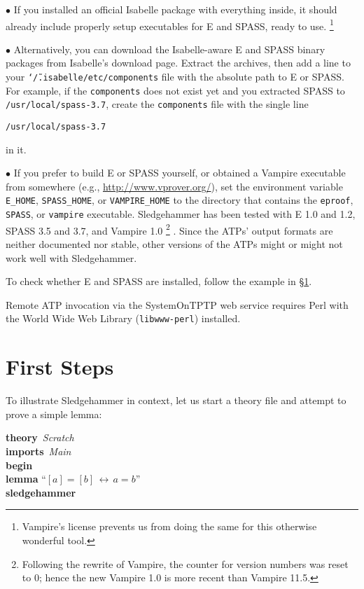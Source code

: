 \documentclass[a4paper,12pt]{article}
\begin{document}
\begin{enum}
\item[$\bullet$] If you installed an official Isabelle package with everything
inside, it should already include properly setup executables for E and SPASS,
ready to use.%
\footnote{Vampire's license prevents us from doing the same for this otherwise
wonderful tool.}

\item[$\bullet$] Alternatively, you can download the Isabelle-aware E and SPASS
binary packages from Isabelle's download page. Extract the archives, then add a
line to your \texttt{\char`\~/.isabelle/etc/components} file with the absolute path to
E or SPASS. For example, if the \texttt{components} does not exist
yet and you extracted SPASS to \texttt{/usr/local/spass-3.7}, create
the \texttt{components} file with the single line

\prew
\texttt{/usr/local/spass-3.7}
\postw

in it.

\item[$\bullet$] If you prefer to build E or SPASS yourself, or obtained a
Vampire executable from somewhere (e.g., \url{http://www.vprover.org/}),
set the environment variable \texttt{E\_HOME}, \texttt{SPASS\_HOME}, or
\texttt{VAMPIRE\_HOME} to the directory that contains the \texttt{eproof},
\texttt{SPASS}, or \texttt{vampire} executable. Sledgehammer has been tested
with E 1.0 and 1.2, SPASS 3.5 and 3.7, and Vampire 1.0%
\footnote{Following the rewrite of Vampire, the counter for version numbers was
reset to 0; hence the new Vampire 1.0 is more recent than Vampire 11.5.}%
. Since the ATPs' output formats are neither documented nor stable, other
versions of the ATPs might or might not work well with Sledgehammer.
\end{enum}

To check whether E and SPASS are installed, follow the example in
\S\ref{first-steps}.

Remote ATP invocation via the SystemOnTPTP web service requires Perl with the
World Wide Web Library (\texttt{libwww-perl}) installed.

\section{First Steps}
\label{first-steps}

To illustrate Sledgehammer in context, let us start a theory file and
attempt to prove a simple lemma:

\prew
\textbf{theory}~\textit{Scratch} \\
\textbf{imports}~\textit{Main} \\
\textbf{begin} \\[2\smallskipamount]
%
\textbf{lemma} ``$[a] = [b] \,\longleftrightarrow\, a = b$'' \\
\textbf{sledgehammer}
\postw
\end{document}
